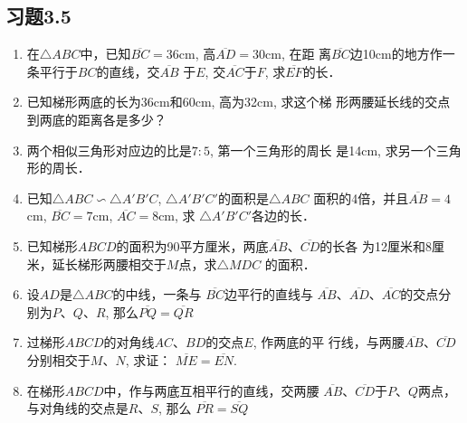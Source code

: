 \subsection*{习题3.5}
\begin{enumerate}
    \item 在$\triangle ABC$中，已知$\overline{BC}=36$cm, 高$\overline{AD}=30$cm, 在距
    离$\overline{BC}$边10cm的地方作一条平行于$BC$的直线，交$\overline{AB}$
    于$E$, 交$\overline{AC}$于$F$, 求$\overline{EF}$的长．
    \item 已知梯形两底的长为36cm和60cm, 高为32cm, 求这个梯
    形两腰延长线的交点到两底的距离各是多少？
    \item 两个相似三角形对应边的比是$7:5$, 第一个三角形的周长
    是14cm, 求另一个三角形的周长．
    \item 已知$\triangle ABC\backsim \triangle A'B'C$, $\triangle A'B'C'$的面积是$\triangle ABC$
    面积的4倍，并且$\overline{AB}=4$cm, $\overline{BC}=7$cm, $\overline{AC}=8$cm, 求
    $\triangle A'B'C'$各边的长．
    \item 已知梯形$ABCD$的面积为90平方厘米，两底$\overline{AB}$、$\overline{CD}$的长各
    为12厘米和8厘米，延长梯形两腰相交于$M$点，求$\triangle MDC$
    的面积．
    \item 设$AD$是$\triangle ABC$的中线，一条与
    $\overline{BC}$边平行的直线与
    $\overline{AB}$、$\overline{AD}$、$\overline{AC}$的交点分别为$P$、$Q$、$R$, 那么$\overline{PQ}=\overline{QR}$
    \item 过梯形$ABCD$的对角线$AC$、$BD$的交点$E$, 作两底的平
    行线，与两腰$\overline{AB}$、$\overline{CD}$分别相交于$M$、$N$, 求证：
    $\overline{ME}=\overline{EN}$.
    \item 在梯形$ABCD$中，作与两底互相平行的直线，交两腰
    $\overline{AB}$、$\overline{CD}$于$P$、$Q$两点，与对角线的交点是$R$、$S$, 那么
    $\overline{PR}=\overline{SQ}$
\end{enumerate}

